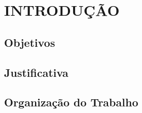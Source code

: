 \chapter{INTRODUÇÃO}
\thispagestyle{empty}

\section{Objetivos}



\section{Justificativa}


\section{Organização do Trabalho}
